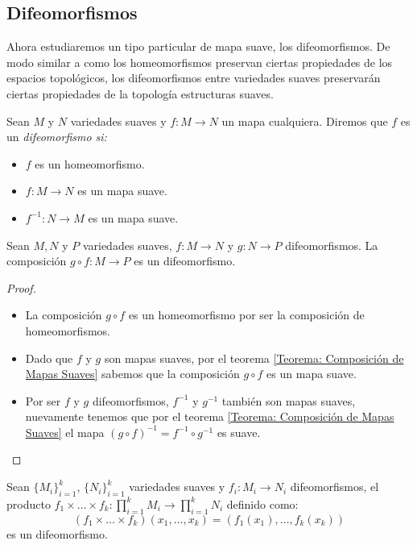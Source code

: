 \subsection{Difeomorfismos}\label{Subsección: Difeomorfismos}
Ahora estudiaremos un tipo particular de mapa suave, los difeomorfismos. De modo similar a como los homeomorfismos preservan ciertas propiedades de los espacios topológicos, los difeomorfismos entre variedades suaves preservarán ciertas propiedades de la topología estructuras suaves.

\begin{definition}[Difeomorfismo]\label{Definición: Difeomorfismo}
  Sean $M$ y $N$ variedades suaves y $f: M \to N$ un mapa cualquiera. Diremos que $f$ es un \it{difeomorfismo} si:
\begin{itemize}
  \item $f$ es un homeomorfismo.
  \item $f: M \to N$ es un mapa suave.
  \item $f^{-1}: N \to M$ es un mapa suave.
\end{itemize}
\end{definition}

\begin{theorem}\label{Teorema: Composición de Difeomorfismos}
Sean $M, N$ y $P$ variedades suaves, $f: M \to N$ y $g: N \to P$ difeomorfismos. La composición $g \circ f: M \to P$ es un difeomorfismo.
\end{theorem}

\begin{proof}
\begin{itemize}
\item La composición $g \circ f$ es un homeomorfismo por ser la composición de homeomorfismos.
\item Dado que $f$ y $g$ son mapas suaves, por el teorema \ref{Teorema: Composición de Mapas Suaves} sabemos que la composición $g \circ f$ es un mapa suave.
\item Por ser $f$ y $g$ difeomorfismos, $f^{-1}$ y $g^{-1}$ también son mapas suaves, nuevamente tenemos que por el teorema \ref{Teorema: Composición de Mapas Suaves} el mapa $(g\circ f)^{-1} = f^{-1} \circ g^{-1}$ es suave.
\end{itemize}
\end{proof}

\begin{theorem}
  Sean $\{M_i\}_{i=1}^{k}$, $\{N_i\}_{i=1}^{k}$ variedades suaves y $f_i: M_i \to N_i$ difeomorfismos, el producto $f_1 \times \dots \times f_k: \prod_{i=1}^{k} M_i \to \prod_{i=1}^{k} N_i$ definido como:
  \[
    (f_1 \times \dots \times f_k)(x_1, \dots, x_k) = (f_1(x_1), \dots, f_k(x_k))
  \]
  es un difeomorfismo.
\end{theorem}

